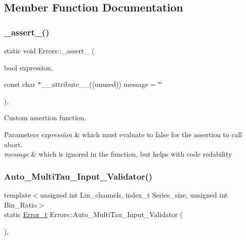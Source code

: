 \subsection{Member Function Documentation}
\mbox{\label{classErrors_a3618ed0e7aba69be0759fa821a987b3b}} 
\subsubsection{\texorpdfstring{\+\_\+assert\+\_\+()}{\_assert\_()}}
{\footnotesize\ttfamily static void Errors\+::\+\_\+assert\+\_\+ (\begin{DoxyParamCaption}\item[{bool}]{expression,  }\item[{const char $\ast$\+\_\+\+\_\+attribute\+\_\+\+\_\+((unused))}]{message = {\ttfamily \char`\"{}\char`\"{}} }\end{DoxyParamCaption})\hspace{0.3cm}{\ttfamily [inline]}, {\ttfamily [static]}}



Custom assertion function. 


\begin{DoxyParams}{Parameters}
{\em expression} & which must evaluate to false for the assertion to call abort. \\
\hline
{\em message} & which is ignored in the function, but helps with code redability \\
\hline
\end{DoxyParams}
\mbox{\label{classErrors_a8578169dc7b56d2080f07a0647f627e1}} 
\subsubsection{\texorpdfstring{Auto\+\_\+\+Multi\+Tau\+\_\+\+Input\+\_\+\+Validator()}{Auto\_MultiTau\_Input\_Validator()}}
{\footnotesize\ttfamily template$<$unsigned int Lin\+\_\+channels, index\+\_\+t Series\+\_\+size, unsigned int Bin\+\_\+\+Ratio$>$ \\
static \hyperlink{errors_8hpp_a4e8c0d09726859e3d3369c0da5a1aa7f}{Error\+\_\+t} Errors\+::\+Auto\+\_\+\+Multi\+Tau\+\_\+\+Input\+\_\+\+Validator (\begin{DoxyParamCaption}{ }\end{DoxyParamCaption})\hspace{0.3cm}{\ttfamily [inline]}, {\ttfamily [static]}}



